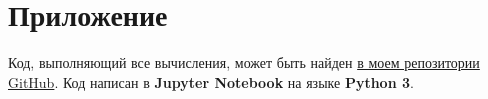 \documentclass[12pt,a4paper,oneside]{article}
\begin{document}

\section{Приложение}

Код, выполняющий все вычисления, может быть найден \href{https://github.com/BasilMinkov/Jupyter-Notebooks/blob/master/HamsterEEG.ipynb}{в моем репозитории GitHub}. Код написан в \textbf{Jupyter Notebook} на языке \textbf{Python 3}.










\end{document}
